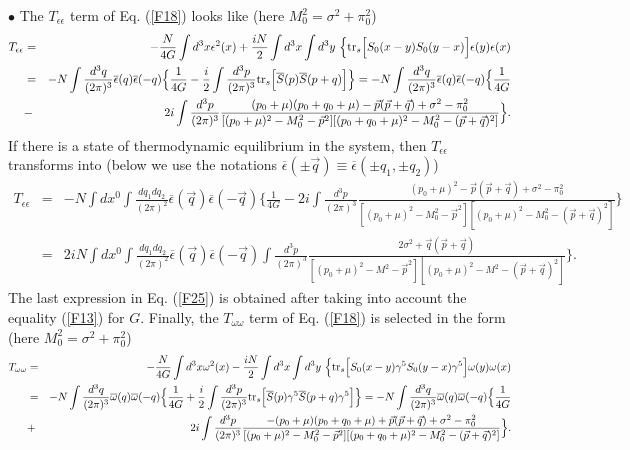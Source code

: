 \documentclass[12pt,a4paper]{article}
\begin{document}
$\bullet$ The $T_{\epsilon\epsilon}$ term of Eq. (\ref{F18}) looks like (here $M_0^2=\sigma^2+\pi_0^2$)
\begin{eqnarray}
T_{\epsilon\epsilon}&=&-\frac{N}{4G}\int d^3x \epsilon^2(x)+\frac{iN}{2}\int d^3x\int d^3y~
\Big\{{\rm tr}_s\Big[S_0(x-y)S_0(y-x)\Big]\epsilon(y)\epsilon(x)\nonumber\\&=&
-N\int \frac{d^3q}{(2\pi)^3}
\overline \epsilon (q)\overline \epsilon (-q)\Big\{\frac{1}{4G}-\frac{i}{2}\int \frac{d^3p}{(2\pi)^3}{\rm tr}_s
\Big[\overline S(p)\overline S(p+q)\Big]\Big\}=-N\int \frac{d^3q}{(2\pi)^3}
\overline \epsilon (q)\overline \epsilon (-q)\Big\{\frac{1}{4G}\nonumber\\
&-&2i\int \frac{d^3p}{(2\pi)^3}\frac{(p_0+\mu)(p_0+q_0+\mu)-\vec p(\vec p+\vec q)+
\sigma^2-\pi_0^2}{[(p_0+\mu)^2-M_0^2-\vec p^2][(p_0+q_0+\mu)^2-M_0^2-(\vec p+\vec q)^2]}
\Big\}.
\label{F24}
\end{eqnarray}
If there is a state of thermodynamic equilibrium in the system, then $T_{\epsilon\epsilon}$
transforms into (below we use the notations $\overline\epsilon (\pm\vec q)\equiv\overline
\epsilon (\pm q_1,\pm q_2)$)
\begin{eqnarray}
T_{\epsilon\epsilon}&=&-N\int dx^0\int \frac{dq_1dq_2}{(2\pi)^2}
\overline \epsilon (\vec q)\overline \epsilon (-\vec q)\Big\{\frac{1}{4G}
-2i\int \frac{d^3p}{(2\pi)^3}\frac{(p_0+\mu)^2-\vec p(\vec p+\vec q)+
\sigma^2-\pi_0^2}{[(p_0+\mu)^2-M_0^2-\vec p^2][(p_0+\mu)^2-M_0^2-(\vec p+\vec q)^2]}
\Big\}\nonumber\\
&=&2iN\int dx^0\int \frac{dq_1dq_2}{(2\pi)^2}
\overline \epsilon (\vec q)\overline \epsilon (-\vec q)\int \frac{d^3p}{(2\pi)^3}\frac{2\sigma^2+
\vec q(\vec p+\vec q)}{[(p_0+\mu)^2-M^2-\vec p^2][(p_0+\mu)^2-M^2-(\vec p+\vec q)^2]}
\Big\}.
\label{F25}
\end{eqnarray}
The last expression in Eq. (\ref{F25}) is obtained after taking into account the equality
(\ref{F13}) for $G$. Finally, the $T_{\omega\omega}$ term of Eq. (\ref{F18}) is selected in the form (here $M_0^2=\sigma^2+\pi_0^2$)
\begin{eqnarray}
T_{\omega\omega}&=&-\frac{N}{4G}\int d^3x \omega^2(x)-\frac{iN}{2}\int d^3x\int d^3y~
\Big\{{\rm tr}_s\Big[S_0(x-y)\gamma^5S_0(y-x)\gamma^5\Big]\omega(y)\omega(x)\nonumber\\&=&
-N\int \frac{d^3q}{(2\pi)^3}
\overline \omega (q)\overline \omega (-q)\Big\{\frac{1}{4G}+\frac{i}{2}\int \frac{d^3p}{(2\pi)^3}{\rm tr}_s
\Big[\overline S(p)\gamma^5\overline S(p+q)\gamma^5\Big]\Big\}=-N\int \frac{d^3q}{(2\pi)^3}
\overline \omega (q)\overline \omega (-q)\Big\{\frac{1}{4G}\nonumber\\
&+&2i\int \frac{d^3p}{(2\pi)^3}\frac{-(p_0+\mu)(p_0+q_0+\mu)+\vec p(\vec p+\vec q)+
\sigma^2-\pi_0^2}{[(p_0+\mu)^2-M_0^2-\vec p^2][(p_0+q_0+\mu)^2-M_0^2-(\vec p+\vec q)^2]}
\Big\}.
\label{F26}
\end{eqnarray}
\end{document}

